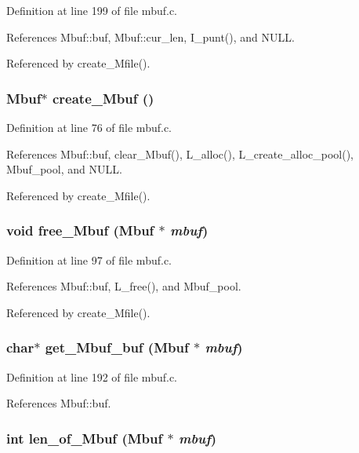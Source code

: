 Definition at line 199 of file mbuf.c.

References Mbuf::buf, Mbuf::cur\_\-len, I\_\-punt(), and NULL.

Referenced by create\_\-Mfile().
\subsubsection{\setlength{\rightskip}{0pt plus 5cm}\bf{Mbuf}$\ast$ create\_\-Mbuf ()}\label{mbuf_8h_b8cda8111fbc6f311789287d0da940c0}




Definition at line 76 of file mbuf.c.

References Mbuf::buf, clear\_\-Mbuf(), L\_\-alloc(), L\_\-create\_\-alloc\_\-pool(), Mbuf\_\-pool, and NULL.

Referenced by create\_\-Mfile().
\subsubsection{\setlength{\rightskip}{0pt plus 5cm}void free\_\-Mbuf (\bf{Mbuf} $\ast$ {\em mbuf})}\label{mbuf_8h_ddc737730a33ac71ecf20eea569109da}




Definition at line 97 of file mbuf.c.

References Mbuf::buf, L\_\-free(), and Mbuf\_\-pool.

Referenced by create\_\-Mfile().
\subsubsection{\setlength{\rightskip}{0pt plus 5cm}char$\ast$ get\_\-Mbuf\_\-buf (\bf{Mbuf} $\ast$ {\em mbuf})}\label{mbuf_8h_1c89d1ad9dc057da36fcd31172947268}




Definition at line 192 of file mbuf.c.

References Mbuf::buf.
\subsubsection{\setlength{\rightskip}{0pt plus 5cm}int len\_\-of\_\-Mbuf (\bf{Mbuf} $\ast$ {\em mbuf})}\label{mbuf_8h_ce4134f51839529d98f13bb2781c0685}




